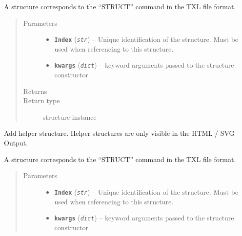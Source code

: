 \documentclass[letterpaper,10pt,english]{sphinxmanual}
\begin{document}
\begin{fulllineitems}
\begin{fulllineitems}
A structure corresponds to the ``STRUCT'' command in the TXL file format.
\begin{quote}\begin{description}
\item[{Parameters}] \leavevmode\begin{itemize}
\item {} 
\textbf{\texttt{Index}} (\emph{\texttt{str}}) -- Unique identification of the structure. Must be used when referencing to this structure.

\item {} 
\textbf{\texttt{kwargs}} (\emph{\texttt{dict}}) -- keyword arguments passed to the structure constructor

\end{itemize}

\item[{Returns}] \leavevmode


\item[{Return type}] \leavevmode
{} structure instance

\end{description}\end{quote}

\end{fulllineitems}


\begin{fulllineitems}
\label{Chapters/40_PythonModuleReference:TXLWizard.TXLWriter.TXLWriter.AddHelperStructure}
Add helper structure. Helper structures are only visible in the HTML / SVG Output.

A structure corresponds to the ``STRUCT'' command in the TXL file format.
\begin{quote}\begin{description}
\item[{Parameters}] \leavevmode\begin{itemize}
\item {} 
\textbf{\texttt{Index}} (\emph{\texttt{str}}) -- Unique identification of the structure. Must be used when referencing to this structure.

\item {} 
\textbf{\texttt{kwargs}} (\emph{\texttt{dict}}) -- keyword arguments passed to the structure constructor

\end{itemize}


\end{description}
\end{quote}
\end{fulllineitems}
\end{fulllineitems}
\end{document}
